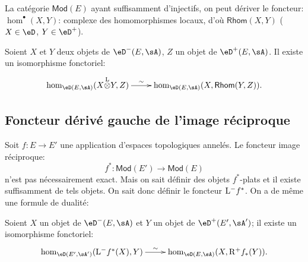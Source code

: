 La catégorie $\mathsf{Mod}(E)$ ayant suffisamment d'injectifs, on peut 
dériver le foncteur: $\hom^\bullet(X,Y)$: complexe des homomorphismes locaux,  
d'où $\mathsf{Rhom}(X,Y)$ ($X\in \eD$, $Y\in \eD^+$). 

Soient $X$ et $Y$ deux objets de $\eD^-(E,\sA)$, $Z$ un objet de 
$\eD^+(E,\sA)$. Il existe un isomorphisme fonctoriel: 
\[\xymatrix{
  \hom_{\eD(E,\sA)}(X\lotimes Y,Z) \ar[r]^-\sim 
    &\hom_{\eD(E,\sA)}(X,\mathsf{Rhom}(Y,Z)) \text{.}
}\]










\subsection{Foncteur dérivé gauche de l'image réciproque}\label{VIII:6-3}

Soit $f:E\to E'$ une application d'espaces topologiques annelés. Le 
foncteur image réciproque: 
\[
  f^\ast:\mathsf{Mod}(E') \to \mathsf{Mod}(E) 
\]
n'est pas nécessairement exact. Mais on sait définir des objets 
$f^\ast$-plats et il existe suffisamment de tels objets. On sait donc 
définir le foncteur $\mathrm{L}^- f^\ast$. On a de même une formule de dualité: 

Soient $X$ un objet de $\eD^-(E,\sA)$ et $Y$ un objet de 
$\eD^+(E',\sA')$; il existe un isomorphisme fonctoriel: 
\[\xymatrix{
  \hom_{\eD(E',\sA')}(\eL^- f^\ast(X),Y) \ar[r]^-\sim 
    & \hom_{\eD(E,\sA)}(X,\eR^+ f_\ast(Y)) \text{.}
}\]
















